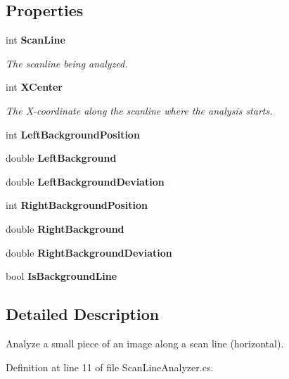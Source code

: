 \subsection*{Properties}
\begin{DoxyCompactItemize}
\item 
int {\bf ScanLine}\hspace{0.3cm}{\ttfamily  [get, set]}
\begin{DoxyCompactList}\small\item\em The scanline being analyzed. \item\end{DoxyCompactList}\item 
int {\bf XCenter}\hspace{0.3cm}{\ttfamily  [get, set]}
\begin{DoxyCompactList}\small\item\em The X-\/coordinate along the scanline where the analysis starts. \item\end{DoxyCompactList}\item 
int {\bf LeftBackgroundPosition}\hspace{0.3cm}{\ttfamily  [get, set]}
\item 
double {\bf LeftBackground}\hspace{0.3cm}{\ttfamily  [get, set]}
\item 
double {\bf LeftBackgroundDeviation}\hspace{0.3cm}{\ttfamily  [get, set]}
\item 
int {\bf RightBackgroundPosition}\hspace{0.3cm}{\ttfamily  [get, set]}
\item 
double {\bf RightBackground}\hspace{0.3cm}{\ttfamily  [get, set]}
\item 
double {\bf RightBackgroundDeviation}\hspace{0.3cm}{\ttfamily  [get, set]}
\item 
bool {\bf IsBackgroundLine}\hspace{0.3cm}{\ttfamily  [get, set]}
\end{DoxyCompactItemize}


\subsection{Detailed Description}
Analyze a small piece of an image along a scan line (horizontal). 

Definition at line 11 of file ScanLineAnalyzer.cs.


